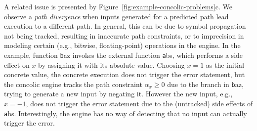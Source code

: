 {\begin{minipage}{4.3 in}
	A related issue is presented by Figure~\ref{fig:example-concolic-problems}c. We observe a {\em path divergence} when inputs generated for a predicted path lead execution to a different path. In general, this can be due to symbol propagation not being tracked, resulting in inaccurate path constraints, or to imprecision in modeling certain (e.g., bitwise, floating-point) operations in the engine. In the example, function {\texttt baz} invokes the external function {\texttt abs}, which performs a side effect on $x$ by assigning it with its absolute value. Choosing $x = 1$ as the initial concrete value, the concrete execution does not trigger the error statement, but the concolic engine tracks the path constraint $\alpha_x \geq 0$ due to the branch in {\texttt baz}, trying to generate a new input by negating it. However the new input, e.g., $x = -1$, does not trigger the error statement due to the (untracked) side effects of {\texttt abs}. Interestingly, the engine has no way of detecting that no input can actually trigger the error.
\end{minipage}}

